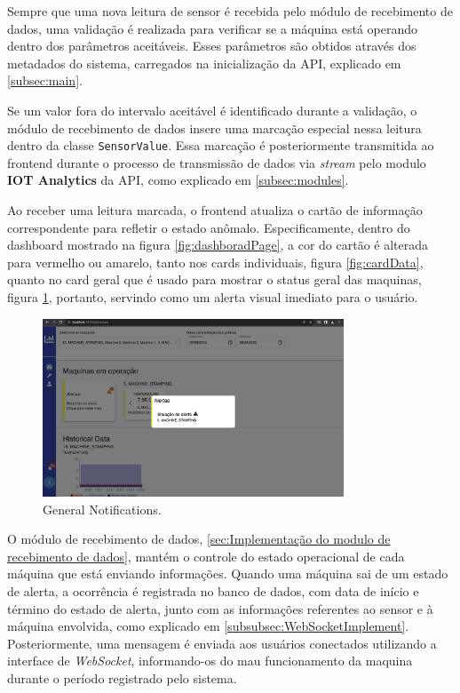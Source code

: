 Sempre que uma nova leitura de sensor é recebida pelo módulo de recebimento de dados, uma validação é realizada para verificar se a máquina está operando dentro dos parâmetros aceitáveis. Esses parâmetros são obtidos através dos metadados do sistema, carregados na inicialização da \gls{API}, explicado em \ref{subsec:main}.

Se um valor fora do intervalo aceitável é identificado durante a validação, o módulo de recebimento de dados insere uma marcação especial nessa leitura dentro da classe \texttt{SensorValue}. Essa marcação é posteriormente transmitida ao frontend durante o processo de transmissão de dados via \textit{stream} pelo modulo \textbf{IOT Analytics} da \gls{API}, como explicado em \ref{subsec:modules}.

Ao receber uma leitura marcada, o frontend atualiza o cartão de informação correspondente para refletir o estado anômalo. Especificamente, dentro do dashboard mostrado na figura \ref{fig:dashboradPage}, a cor do cartão é alterada para vermelho ou amarelo, tanto nos cards individuais, figura \ref{fig:cardData}, quanto no card geral que é usado para mostrar o status geral das maquinas, figura \ref{fig:geralMachineAlert}, portanto, servindo como um alerta visual imediato para o usuário. 

\begin{figure}[htbp]
	\centering
	\includegraphics[width=0.8\textwidth]{images/geralMachineAlert.png}
	\caption{General Notifications.}
	\label{fig:geralMachineAlert}
\end{figure}

O módulo de recebimento de dados, \ref{sec:Implementação do modulo de recebimento de dados}, mantém o controle do estado operacional de cada máquina que está enviando informações. Quando uma máquina sai de um estado de alerta, a ocorrência é registrada no banco de dados, com data de início e término do estado de alerta, junto com as informações referentes ao sensor e à máquina envolvida, como explicado em \ref{subsubsec:WebSocketImplement}. Posteriormente, uma mensagem é enviada aos usuários conectados utilizando a interface de \textit{WebSocket}, informando-os do mau funcionamento da maquina durante o período registrado pelo sistema.

